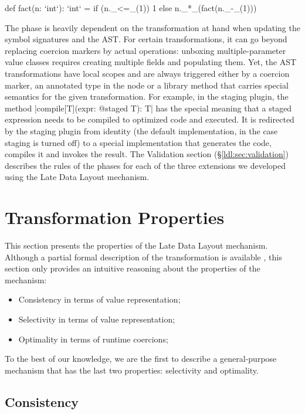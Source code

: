 \begin{lstlisting-nobreak}
 def fact(n: `int`): `int` =
   if (n._<=_(1))
     1
   else
     n._*_(fact(n._-_(1)))
\end{lstlisting-nobreak}

The \commit{} phase is heavily dependent on the transformation at hand when updating the symbol signatures and the AST. For certain transformations, it can go beyond replacing coercion markers by actual operations: unboxing multiple-parameter value classes requires creating multiple fields and populating them. Yet, the AST transformations have local scopes and are always triggered either by a coercion marker, an annotated type in the node or a library method that carries special semantics for the given transformation. For example, in the staging plugin, the method |compile[T](expr: @staged T): T| has the special meaning that a staged expression needs to be compiled to optimized code and executed. It is redirected by the staging plugin from identity (the default implementation, in the case staging is turned off) to a special implementation that generates the code, compiles it and invokes the result. The Validation section (\S\ref{ldl:sec:validation}) describes the rules of the \commit{} phases for each of the three extensions we developed using the Late Data Layout mechanism.

\section{Transformation Properties}
\label{ldl:sec:transform-props}

This section presents the properties of the Late Data Layout mechanism. Although a partial formal description of the transformation is available \cite{ldl-form}, this section only provides an intuitive reasoning about the properties of the mechanism:

\begin{itemize}
\item Consistency in terms of value representation;
\item Selectivity in terms of value representation;
\item Optimality in terms of runtime coercions;
\end{itemize}

To the best of our knowledge, we are the first to describe a general-purpose mechanism that has the last two properties: selectivity and optimality.

\subsection{Consistency}

